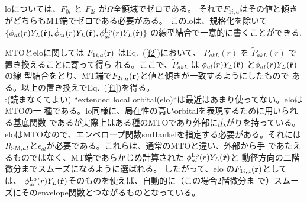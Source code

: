 \documentclass[twocolumn,showpacs,preprintnumbers,amsmath,amssymb,floatfix]{revtex4-1}
\newcommand{\bfr}{{\bf r}}
\newcommand{\refeq}[1]{Eq.~(\ref{#1})}
\newcommand{\req}[1]{\mbox{Eq.~\!(\ref{#1})}}
\def\smh{smHankel}
\def\RSMal{R_{{\rm SM},al}}
\def\epsilonal{\epsilon_{al}}
\def\philo{{\phi}^{\rm Lo}_{al}}
\def\smh{smHankel}
\def\RSMal{R_{{\rm SM},al}}
\def\epsilonal{\epsilon_{al}}
\def\philo{{\phi}^{\rm Lo}_{al}}
\begin{document}
loについては、$F_{0i}$ と $F_{2i}$ が$\Omega$全領域でゼロである。
それで$F_{1i,a}$はその値と傾きがどちらもMT端でゼロである必要がある。
このloは、規格化を除いて
$\{\phi_{al}(r)Y_L(\hat{\bfr}),\dot{\phi}_{al}(r)Y_L(\hat{\bfr}),\philo(r)Y_L(\hat{\bfr}) \}$
の線型結合で一意的に書くことができる\cite{lo}.

MTOとeloに関しては $F_{1i,a}(\bfr)$ は\refeq{f2}において、
${P}_{akL}(r)$ を $\widetilde{P}_{akL}(r)$ で置き換えることに寄って得ら
れる。ここで、$\widetilde{P}_{akL}$ は
 $\phi_{al}(r)Y_L(\hat{\bfr})$ と$\dot{\phi}_{al}(r)Y_L(\hat{\bfr})$の線
 型結合をとり、MT端で$F_{2i,a}(\bfr)$と値と傾きが一致するようにしたもので
 ある。以上の置き換えで\req{f1}を得る。\\

{\small
{}:(読まなくてよい)
``extended local orbital(elo)``は最近はあまり使ってない。eloはMTOの一
種である。lo同様に、局在性の高いorbitalを表現するために用いられる基底関数
であるが実際上はある種のMTOであり外部に広がりを持っている。
eloはMTOなので、エンベロープ関数\smh を指定する必要がある。それには
$\RSMal$と$\epsilonal$が必要である。これらは、通常のMTOと違い、外部から手
であたえるものではなく、MT端であらかじめ計算された
$\philo(r)Y_L(\hat{\bfr})$と
動径方向の二階微分までスムーズになるように選ばれる。
したがって、elo の$F_{1i,a}(\bfr)$としては、
$\philo(r)Y_L(\hat{\bfr})$そのものを使えば、自動的に（この場合2階微分ま
で）スムーズにそのenvelope関数とつながるものとなっている。
}



\end{document}
